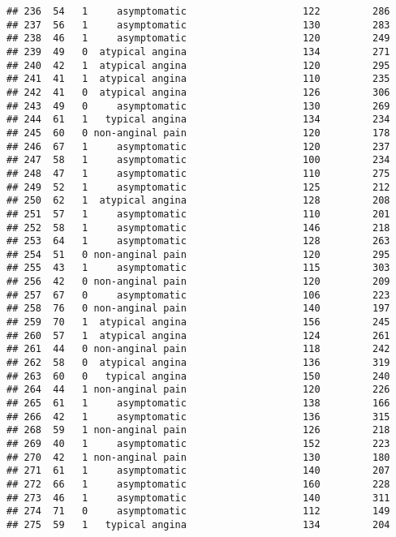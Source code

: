 \documentclass[]{article}
\begin{document}
\begin{verbatim}
## 236  54   1     asymptomatic                    122         286
## 237  56   1     asymptomatic                    130         283
## 238  46   1     asymptomatic                    120         249
## 239  49   0  atypical angina                    134         271
## 240  42   1  atypical angina                    120         295
## 241  41   1  atypical angina                    110         235
## 242  41   0  atypical angina                    126         306
## 243  49   0     asymptomatic                    130         269
## 244  61   1   typical angina                    134         234
## 245  60   0 non-anginal pain                    120         178
## 246  67   1     asymptomatic                    120         237
## 247  58   1     asymptomatic                    100         234
## 248  47   1     asymptomatic                    110         275
## 249  52   1     asymptomatic                    125         212
## 250  62   1  atypical angina                    128         208
## 251  57   1     asymptomatic                    110         201
## 252  58   1     asymptomatic                    146         218
## 253  64   1     asymptomatic                    128         263
## 254  51   0 non-anginal pain                    120         295
## 255  43   1     asymptomatic                    115         303
## 256  42   0 non-anginal pain                    120         209
## 257  67   0     asymptomatic                    106         223
## 258  76   0 non-anginal pain                    140         197
## 259  70   1  atypical angina                    156         245
## 260  57   1  atypical angina                    124         261
## 261  44   0 non-anginal pain                    118         242
## 262  58   0  atypical angina                    136         319
## 263  60   0   typical angina                    150         240
## 264  44   1 non-anginal pain                    120         226
## 265  61   1     asymptomatic                    138         166
## 266  42   1     asymptomatic                    136         315
## 268  59   1 non-anginal pain                    126         218
## 269  40   1     asymptomatic                    152         223
## 270  42   1 non-anginal pain                    130         180
## 271  61   1     asymptomatic                    140         207
## 272  66   1     asymptomatic                    160         228
## 273  46   1     asymptomatic                    140         311
## 274  71   0     asymptomatic                    112         149
## 275  59   1   typical angina                    134         204

\end{verbatim}
\end{document}
